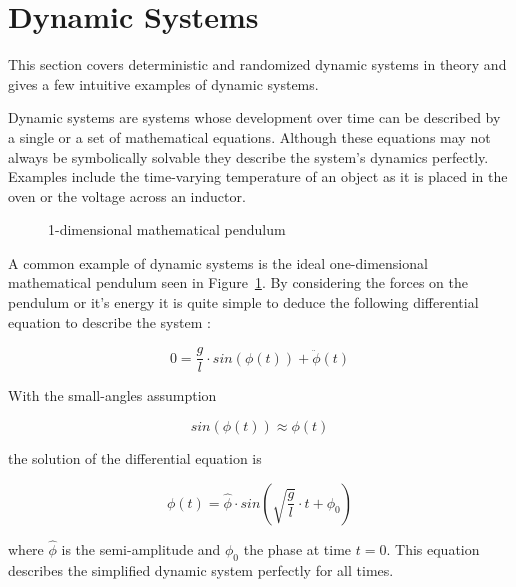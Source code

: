 \section{Dynamic Systems}

\label{sec:dynamicsystems}

This section covers deterministic and randomized dynamic systems in theory and gives a few intuitive examples of dynamic systems.

Dynamic systems are systems whose development over time can be described by a single or a set of mathematical equations. Although these equations may not always be symbolically solvable they describe the system's dynamics perfectly. Examples include the time-varying temperature of an object as it is placed in the oven or the voltage across an inductor.

\begin{figure}
\begin{center}
\end{center}
\caption{1-dimensional mathematical pendulum}
\label{1dpendulum}
\end{figure}

A common example of dynamic systems is the ideal one-dimensional mathematical pendulum seen in Figure~\ref{1dpendulum}. By considering the forces on the pendulum or it's energy it is quite simple to deduce the following differential equation to describe the system \cite{physics}:

\[
0 = \frac{g}{l}\cdot sin(\phi(t))+\ddot{\phi}(t)
\]

With the small-angles assumption

\[
sin(\phi(t))\approx\phi(t)
\]

the solution of the differential equation is

\[
\phi(t) = \hat{\phi} \cdot sin( \sqrt{\frac{g}{l}} \cdot t + {\phi}_0)
\]

where $\hat{\phi}$ is the semi-amplitude and ${\phi}_0$ the phase at time $t=0$. This equation describes the simplified dynamic system perfectly for all times.

